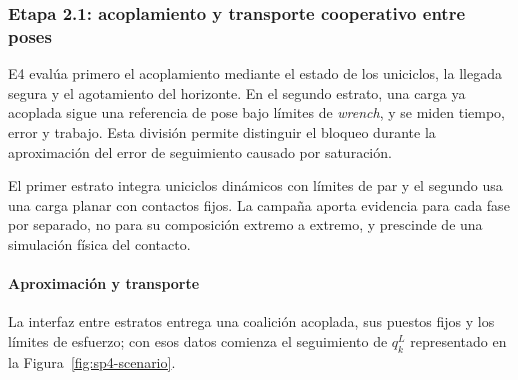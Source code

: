 

\subsubsection{Etapa 2.1: acoplamiento y transporte cooperativo entre poses}
\label{subsubsec:sp2-transport}

E4 evalúa primero el acoplamiento mediante el estado de los uniciclos, la llegada segura y el agotamiento del horizonte. En el segundo estrato, una carga ya acoplada sigue una referencia de pose bajo límites de \emph{wrench}, y se miden tiempo, error y trabajo. Esta división permite distinguir el bloqueo durante la aproximación del error de seguimiento causado por saturación.

El primer estrato integra uniciclos dinámicos con límites de par y el segundo usa una carga planar con contactos fijos. La campaña aporta evidencia para cada fase por separado, no para su composición extremo a extremo, y prescinde de una simulación física del contacto.

\paragraph{Aproximación y transporte}

La interfaz entre estratos entrega una coalición acoplada, sus puestos fijos y los límites de esfuerzo; con esos datos comienza el seguimiento de $q_k^L$ representado en la Figura~\ref{fig:sp4-scenario}.

